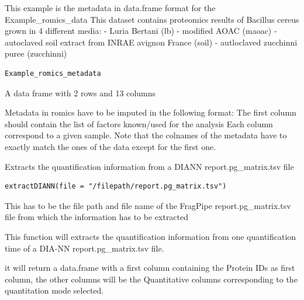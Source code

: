 \documentclass[a4paper]{book}
\begin{document}
%
\begin{Description}
This example is the metadata in data.frame format for the Example\_romics\_data
This dataset contains proteomics results of Bacillus cereus grown in 4 different media:
- Luria Bertani (lb)
- modified AOAC (maoac)
- autoclaved soil extract from INRAE avignon France (soil)
- autloclaved zucchinni puree (zucchinni)
\end{Description}
%
\begin{Usage}
\begin{verbatim}
Example_romics_metadata
\end{verbatim}
\end{Usage}
%
\begin{Format}
A data frame with 2 rows and 13 columns
\end{Format}
%
\begin{Details}
Metadata in romics have to be imputed in the following format:
The first column should contain the list of factors known/used for the analysis
Each column correspond to a given sample.
Note that the colnames of the metadata have to exactly match the ones of the data except for the first one.
\end{Details}
%
\begin{Description}
Extracts the quantification information from a DIANN report.pg\_matrix.tsv file
\end{Description}
%
\begin{Usage}
\begin{verbatim}
extractDIANN(file = "/filepath/report.pg_matrix.tsv")
\end{verbatim}
\end{Usage}
%
\begin{Arguments}
\begin{ldescription}
\item[\code{file}] This has to be the file path and file name of the FragPipe report.pg\_matrix.tsv file from which the information has to be extracted
\end{ldescription}
\end{Arguments}
%
\begin{Details}
This function will extracts the quantification information from one quantification time of a DIA-NN report.pg\_matrix.tsv file.
\end{Details}
%
\begin{Value}
it will return a data.frame with a first column containing the Protein IDs as first column, the other columns will be the Quantitative columns corresponding to the quantitation mode selected.
\end{Value}
\end{document}
